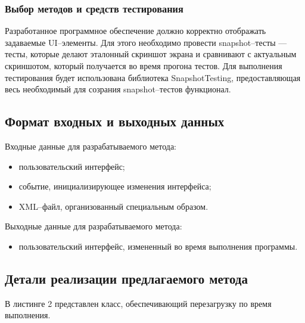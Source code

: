 \subsubsection{Выбор методов и средств тестирования}
Разработанное программное обеспечение должно корректно отображать задаваемые UI--элементы.
Для этого необходимо провести snapshot--тесты --- тесты, которые делают эталонный скриншот экрана и сравнивают с актуальным скриншотом, который получается во время прогона тестов.
Для выполнения тестирования будет использована библиотека SnapshotTesting, предоставляющая весь необходимый для созрания snapshot--тестов функционал.

\subsection{Формат входных и выходных данных}
Входные данные для разрабатываемого метода:

\begin{itemize}[label=---]
	\item пользовательский интерфейс;
	\item событие, инициализирующее изменения интерфейса;
	\item XML--файл, организованный специальным образом.
\end{itemize}

Выходные данные для разрабатываемого метода:

\begin{itemize}[label=---]
	\item пользовательский интерфейс, измененный во время выполнения программы.
\end{itemize}

\subsection{Детали реализации предлагаемого метода}

В листинге 2 представлен класс, обеспечивающий перезагрузку по время выполнения. 


